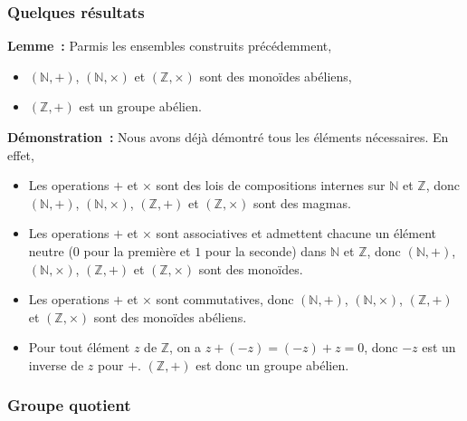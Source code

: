    \done

\subsubsection{Quelques résultats}

\noindent\textbf{Lemme :} Parmis les ensembles construits précédemment, 
    \begin{itemize}[nosep]
        \item $(\mathbb{N},+)$, $(\mathbb{N},\times)$ et $(\mathbb{Z},\times)$ sont des monoïdes abéliens,
        \item $(\mathbb{Z},+)$ est un groupe abélien.
    \end{itemize}

\medskip

\noindent\textbf{Démonstration :} Nous avons déjà démontré tous les éléments nécessaires. 
    En effet, 
    \begin{itemize}[nosep]
        \item Les operations $+$ et $\times$ sont des lois de compositions internes sur $\mathbb{N}$ et $\mathbb{Z}$, donc $(\mathbb{N},+)$, $(\mathbb{N},\times)$, $(\mathbb{Z},+)$ et $(\mathbb{Z},\times)$ sont des magmas.
        \item Les operations $+$ et $\times$ sont associatives et admettent chacune un élément neutre ($0$ pour la première et $1$ pour la seconde) dans $\mathbb{N}$ et $\mathbb{Z}$, donc $(\mathbb{N},+)$, $(\mathbb{N},\times)$, $(\mathbb{Z},+)$ et $(\mathbb{Z},\times)$ sont des monoïdes.
        \item Les operations $+$ et $\times$ sont commutatives, donc $(\mathbb{N},+)$, $(\mathbb{N},\times)$, $(\mathbb{Z},+)$ et $(\mathbb{Z},\times)$ sont des monoïdes abéliens.
        \item Pour tout élément $z$ de $\mathbb{Z}$, on a $z + (-z) = (-z) + z = 0$, donc $-z$ est un inverse de $z$ pour $+$. 
            $(\mathbb{Z},+)$ est donc un groupe abélien.
    \end{itemize}

\subsubsection{Groupe quotient}

